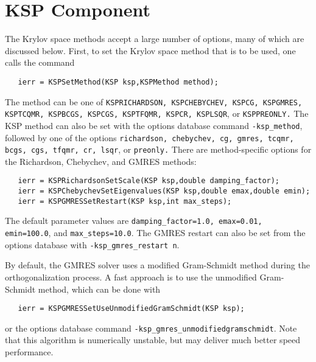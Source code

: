 \section{KSP Component}
\label{sec:ksp}

The Krylov space methods accept a large number of options, many of which 
are discussed below.  First, to set the Krylov space method that is to 
be used, one calls the command 
\begin{verbatim}
   ierr = KSPSetMethod(KSP ksp,KSPMethod method);
\end{verbatim}
The method can be one of {\tt KSPRICHARDSON, KSPCHEBYCHEV, KSPCG, KSPGMRES, 
KSPTCQMR, KSPBCGS, KSPCGS, KSPTFQMR, KSPCR, KSPLSQR}, or {\tt KSPPREONLY.}
  
   
 
The KSP method can also be set with the options database command 
{\tt -ksp\_method},
followed by one of the options {\tt richardson, chebychev, cg, gmres, tcqmr, 
bcgs, cgs, tfqmr, cr, lsqr}, or {\tt preonly.} 
There are method-specific options for the Richardson, Chebychev,
and GMRES  
methods:    
\begin{verbatim}
   ierr = KSPRichardsonSetScale(KSP ksp,double damping_factor);
   ierr = KSPChebychevSetEigenvalues(KSP ksp,double emax,double emin);
   ierr = KSPGMRESSetRestart(KSP ksp,int max_steps);
\end{verbatim}
The default parameter values are {\tt damping\_factor=1.0, 
emax=0.01, emin=100.0}, and {\tt max\_steps=10.0}. The GMRES 
 restart
can also be set from the options database with {\tt -ksp\_gmres\_restart n}.

By default, the GMRES solver uses a modified Gram-Schmidt method 
during the orthogonalization process. A fast approach is to use the 
unmodified Gram-Schmidt method, which can be done 
with  
\begin{verbatim}
   ierr = KSPGMRESSetUseUnmodifiedGramSchmidt(KSP ksp);
\end{verbatim}
or the options database command {\tt -ksp\_gmres\_unmodifiedgramschmidt}.
Note that this algorithm is numerically unstable, but may deliver 
much better speed performance.

